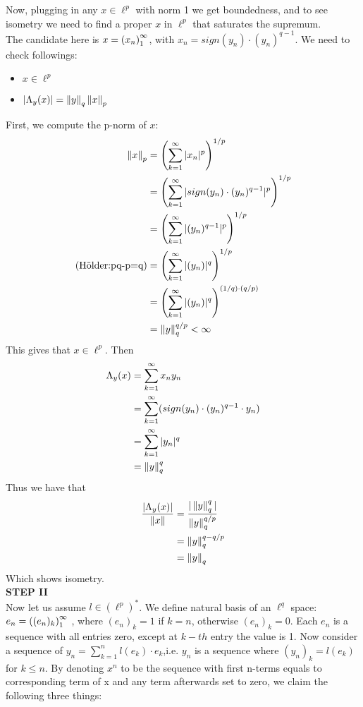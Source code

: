 \begin{theorem}
\begin{equation}
	\end{equation}
	Now, plugging in any $x\in\ell^p$ with norm 1 we get boundedness, and to see isometry we need to find a proper $x$ in $\ell^p$ that saturates the supremum.\\
	The candidate here is $x=\left({x_n}\right)_1^\infty$, with $x_n=sign(y_n)\cdot(y_n)^{q-1}$. We need to check followings:
	\begin{itemize}
		\item $x\in\ell^p$
		\item $|\Lambda_y(x)|=\left\|{y}\right\|_q\left\|{x}\right\|_p$
	\end{itemize}
	First, we compute the p-norm of $x$:
	\begin{equation}
		\begin{split}
			\left\|{x}\right\|_p&=\left(\sum_{k=1}^\infty |x_n|^p\right)^{1/p}\\
			&=\left(\sum_{k=1}^\infty |sign(y_n)\cdot(y_n)^{q-1}|^p\right)^{1/p}\\
			&=\left(\sum_{k=1}^\infty |(y_n)^{q-1}|^p\right)^{1/p}\\
			\text{(Hölder:pq-p=q)}&=\left(\sum_{k=1}^\infty |(y_n)|^q\right)^{1/p}\\
			&=\left(\sum_{k=1}^\infty |(y_n)|^q\right)^{(1/q)\cdot (q/p)}\\
			&=\left\|{y}\right\|_q^{q/p}<\infty
		\end{split}
	\end{equation}
	This gives that $x\in\ell^p$. Then
	\begin{equation}
		\begin{split}
			\Lambda_y(x)&=\sum_{k=1}^{\infty}x_ny_n\\
			&=\sum_{k=1}^{\infty}(sign(y_n)\cdot(y_n)^{q-1}\cdot y_n)\\
			&=\sum_{k=1}^{\infty}|y_n|^q\\
			&=\left\|{y}\right\|_q^q
		\end{split}
	\end{equation}
	Thus we have that 
	\begin{equation}
		\begin{split}
			\frac{|\Lambda_y(x)|}{\left\|{x}\right\|}&=\frac{|\left\|{y}\right\|_q^q|}{\left\|{y}\right\|_q^{q/p}}\\
			&=\left\|{y}\right\|_q^{q-{q/p}}\\
			&=\left\|{y}\right\|_q
		\end{split}
	\end{equation}
	Which shows isometry. \\
	{\bf{STEP II}}\\
	Now let us assume $l\in(\ell^p)^*$. We define natural basis of an $\ell^q$ space: $e_n=\left({(e_n)_k}\right)_1^\infty$ , where $(e_n)_k=1$ if $k=n$, otherwise $(e_n)_k=0$. Each $e_n$ is a sequence with all entries zero, except at $k-th$ entry the value is 1. Now consider a sequence of $y_n=\sum_{k=1}^nl(e_k)\cdot e_k$,i.e. $y_n$ is a sequence where $(y_n)_k=l(e_k)$ for $k\leq n$. By denoting $x^n$ to be the sequence with first n-terms equals to corresponding term of x and any term afterwards set to zero, we claim the following three things:

\end{theorem}
